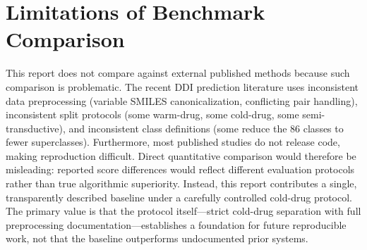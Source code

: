 \documentclass[11pt,a4paper]{report}
\begin{document}
\begin{table}[H]
\centering
\caption{Fold-wise test performance of the strongest cold-drug baseline (GAT+ECFP+LA+DRW).}
\label{tab:fold_results}
\end{table}

\section{Limitations of Benchmark Comparison}
This report does not compare against external published methods because such comparison is problematic. The recent DDI prediction literature uses inconsistent data preprocessing (variable SMILES canonicalization, conflicting pair handling), inconsistent split protocols (some warm-drug, some cold-drug, some semi-transductive), and inconsistent class definitions (some reduce the 86 classes to fewer superclasses). Furthermore, most published studies do not release code, making reproduction difficult. Direct quantitative comparison would therefore be misleading: reported score differences would reflect different evaluation protocols rather than true algorithmic superiority. Instead, this report contributes a single, transparently described baseline under a carefully controlled cold-drug protocol. The primary value is that the protocol itself---strict cold-drug separation with full preprocessing documentation---establishes a foundation for future reproducible work, not that the baseline outperforms undocumented prior systems.
\end{document}
